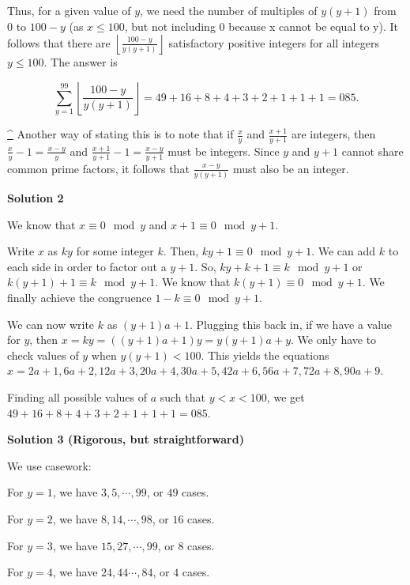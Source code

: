 \begin{enumerate}
 Thus, for a given value of $y$, we need the number of multiples of $y(y+1)$ from $0$ to $100-y$ (as $x \le 100$, but not including 0 because x cannot be equal to y). It follows that there are $\left\lfloor\frac{100-y}{y(y+1)} \right\rfloor$ satisfactory positive integers for all integers $y \le 100$. The answer is 

 
 \[\sum_{y=1}^{99} \left\lfloor\frac{100-y}{y(y+1)} \right\rfloor = 49 + 16 + 8 + 4 + 3 + 2 + 1 + 1 + 1 = \boxed{085}.\]

 

\href{https://artofproblemsolving.com\#ref\_1}{\textasciicircum{}} Another way of stating this is to note that if $\frac{x}{y}$ and $\frac{x+1}{y+1}$ are integers, then $\frac{x}{y} - 1 = \frac{x-y}{y}$ and $\frac{x+1}{y+1} - 1 = \frac{x-y}{y+1}$ must be integers. Since $y$ and $y+1$ cannot share common prime factors, it follows that $\frac{x-y}{y(y+1)}$ must also be an integer.

 



\textbf{Solution 2}

We know that $x \equiv 0 \mod y$ and  $x+1 \equiv 0 \mod y+1$.

 Write $x$ as $ky$ for some integer $k$. Then, $ky+1 \equiv 0\mod y+1$. We can add $k$ to each side in order to factor out a $y+1$. So, $ky+k+1 \equiv k \mod y+1$ or $k(y+1)+1 \equiv k \mod y+1$. We know that $k(y+1) \equiv 0 \mod y+1$. We finally achieve the congruence $1-k \equiv 0 \mod y+1$. 

 We can now write $k$ as $(y+1)a+1$. Plugging this back in, if we have a value for $y$, then $x = ky = ((y+1)a+1)y = y(y+1)a+y$. We only have to check values of $y$ when $y(y+1)<100$. This yields the equations $x = 2a+1, 6a+2, 12a+3, 20a+4, 30a+5, 42a+6, 56a+7, 72a+8, 90a+9$. 

 Finding all possible values of $a$ such that $y<x<100$, we get $49 + 16 + 8 + 4 + 3 + 2 + 1 + 1 + 1 = \boxed{085}.$




\textbf{Solution 3 (Rigorous, but straightforward)}

We use casework: 

 For $y=1$, we have $3,5,\cdots ,99$, or $49$ cases. 

 For $y=2$, we have $8,14,\cdots ,98$, or $16$ cases. 

 For $y=3$, we have $15,27,\cdots ,99$, or $8$ cases. 

 For $y=4$, we have $24,44\cdots ,84$, or $4$ cases. 


\end{enumerate}
